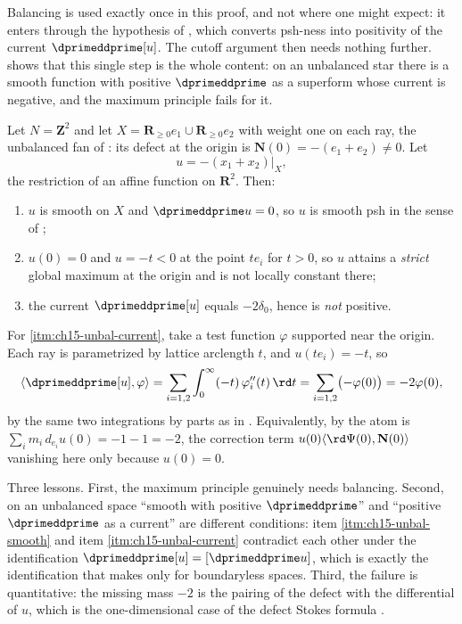 Balancing is used exactly once in this proof, and not where one might expect:
it enters through the hypothesis of
, which converts psh-ness into positivity
of the current $\dprimeddprime[u]$.  The cutoff argument then needs nothing
further.   shows that this single step is the
whole content: on an unbalanced star there is a smooth function with positive
$\dprimeddprime$ as a superform whose current is negative, and the maximum
principle fails for it.

\begin{example}
\label{ex:ch15-unbalanced-max}
Let $N=\mathbf Z^2$ and let
$X=\mathbf R_{\ge0}e_1\cup\mathbf R_{\ge0}e_2$ with weight one on each ray,
the unbalanced fan of : its defect at the origin is
$\mathbf N(0)=-(e_1+e_2)\neq0$.  Let
\[
 u=-(x_1+x_2)\big|_X ,
\]
the restriction of an affine function on $\mathbf R^2$.  Then:
\begin{enumerate}
\item\label{itm:ch15-unbal-smooth} $u$ is smooth on $X$ and
  $\dprimeddprime u=0$, so $u$ is smooth psh in the sense of
  ;
\item\label{itm:ch15-unbal-max} $u(0)=0$ and $u=-t<0$ at the point $te_i$
  for $t>0$, so $u$ attains a \emph{strict} global maximum at the origin and
  is not locally constant there;
\item\label{itm:ch15-unbal-current} the current $\dprimeddprime[u]$ equals
  $-2\delta_0$, hence is \emph{not} positive.
\end{enumerate}
For \cref{itm:ch15-unbal-current}, take a test function $\varphi$ supported
near the origin.  Each ray is parametrized by lattice arclength $t$, and
$u(te_i)=-t$, so
\[
 \langle\dprimeddprime[u],\varphi\rangle
 =\sum_{i=1,2}\int_0^\infty(-t)\,\varphi_i''(t)\,\rd t
 =\sum_{i=1,2}\bigl(-\varphi(0)\bigr)
 =-2\varphi(0),
\]
by the same two integrations by parts as in
.  Equivalently, by
 the atom is $\sum_im_i\,d_{e_i}u(0)=-1-1=-2$,
the correction term $u(0)\langle \rd\Psi(0),\mathbf N(0)\rangle$ vanishing
here only because $u(0)=0$.

Three lessons.  First, the maximum principle genuinely needs balancing.
Second, on an unbalanced space ``smooth with positive $\dprimeddprime$'' and
``positive $\dprimeddprime$ as a current'' are different conditions: item
\cref{itm:ch15-unbal-smooth} and item \cref{itm:ch15-unbal-current} contradict
each other under the identification $\dprimeddprime[u]=[\dprimeddprime u]$,
which is exactly the identification that
 makes only for boundaryless
spaces.  Third, the failure is quantitative: the missing mass $-2$ is the
pairing of the defect with the differential of $u$, which is the
one-dimensional case of the defect Stokes formula
.
\end{example}

